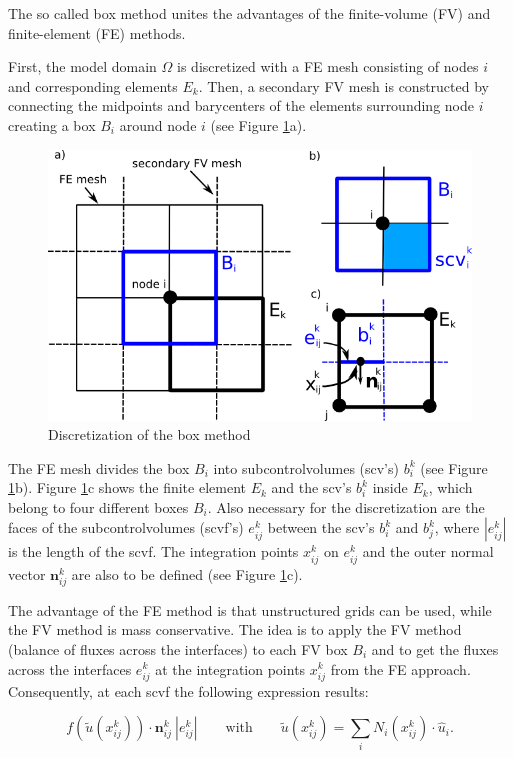 The so called box method unites the advantages of the finite-volume (FV) and
finite-element (FE) methods.

First, the model domain $\Omega$ is discretized with a FE mesh consisting of nodes
$i$ and corresponding elements $E_k$. Then, a secondary FV mesh is constructed
by connecting the midpoints and barycenters of the elements surrounding node
$i$ creating a box $B_i$ around node $i$ (see Figure \ref{pc:box}a).

\begin{figure} [ht]
\includegraphics[width=0.8\linewidth,keepaspectratio]{png/box_disc.png}
\caption{\label{pc:box} Discretization of the box method}
\end{figure}

The FE mesh divides the box $B_i$ into subcontrolvolumes (scv's) $b^k_i$
(see Figure \ref{pc:box}b). Figure \ref{pc:box}c shows the finite element $E_k$
and the scv's $b^k_i$ inside $E_k$, which belong to four different boxes $B_i$.
Also necessary for the discretization are the faces of the subcontrolvolumes (scvf's)
$e^k_{ij}$ between the scv's $b^k_i$ and $b^k_j$, where $|e^k_{ij}|$ is the length
of the scvf. The integration points $x^k_{ij}$ on $e^k_{ij}$ and the outer normal
vector $\mathbf n^k_{ij}$ are also to be defined (see Figure \ref{pc:box}c).

The advantage of the FE method is that unstructured grids can be used, while the
FV method is mass conservative. The idea is to apply the FV method (balance of
fluxes across the interfaces) to each FV box $B_i$  and to get the fluxes across
the interfaces $e^k_{ij}$ at the integration points $x^k_{ij}$ from the FE approach.
Consequently, at each scvf the following expression results:

\begin{equation}
   f(\tilde u(x^k_{ij})) \cdot \mathbf n^k_{ij} \: |e^k_{ij}| \qquad \textrm{with}
   \qquad \tilde u(x^k_{ij}) = \sum_i N_i(x^k_{ij}) \cdot \hat u_i .
\end{equation}

